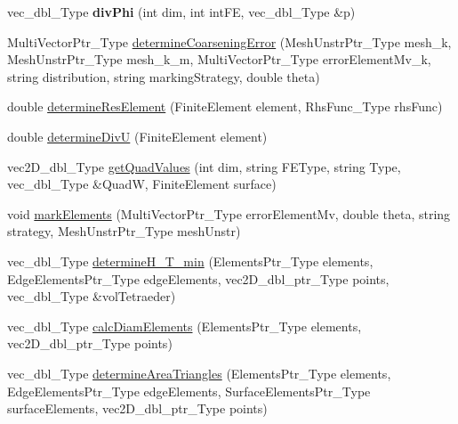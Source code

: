 \begin{DoxyCompactItemize}
\item 
\mbox{\label{classFEDD_1_1ErrorEstimation_a43854de41fd90e4204a87ac5cad78f36}} 
vec\+\_\+dbl\+\_\+\+Type {\bfseries div\+Phi} (int dim, int int\+FE, vec\+\_\+dbl\+\_\+\+Type \&p)
\item 
Multi\+Vector\+Ptr\+\_\+\+Type \hyperlink{classFEDD_1_1ErrorEstimation_afc0daf3841f50012ad8db942b63435ab}{determine\+Coarsening\+Error} (Mesh\+Unstr\+Ptr\+\_\+\+Type mesh\+\_\+k, Mesh\+Unstr\+Ptr\+\_\+\+Type mesh\+\_\+k\+\_\+m, Multi\+Vector\+Ptr\+\_\+\+Type error\+Element\+Mv\+\_\+k, string distribution, string marking\+Strategy, double theta)
\item 
double \hyperlink{classFEDD_1_1ErrorEstimation_a6502dd3ed3942703784a9dc95e656e8f}{determine\+Res\+Element} (Finite\+Element element, Rhs\+Func\+\_\+\+Type rhs\+Func)
\item 
double \hyperlink{classFEDD_1_1ErrorEstimation_a450a2fc3980730dbf0c648e6e9427fd3}{determine\+DivU} (Finite\+Element element)
\item 
vec2\+D\+\_\+dbl\+\_\+\+Type \hyperlink{classFEDD_1_1ErrorEstimation_a642a89cc3290dc92d40ac4d8c2b33266}{get\+Quad\+Values} (int dim, string F\+E\+Type, string Type, vec\+\_\+dbl\+\_\+\+Type \&QuadW, Finite\+Element surface)
\item 
void \hyperlink{classFEDD_1_1ErrorEstimation_a36992830ef4cf5f820ea1c5fedc2a1d1}{mark\+Elements} (Multi\+Vector\+Ptr\+\_\+\+Type error\+Element\+Mv, double theta, string strategy, Mesh\+Unstr\+Ptr\+\_\+\+Type mesh\+Unstr)
\item 
vec\+\_\+dbl\+\_\+\+Type \hyperlink{classFEDD_1_1ErrorEstimation_a256caef9352a4bac19b6d1d2106d14c8}{determine\+H\+\_\+\+T\+\_\+min} (Elements\+Ptr\+\_\+\+Type elements, Edge\+Elements\+Ptr\+\_\+\+Type edge\+Elements, vec2\+D\+\_\+dbl\+\_\+ptr\+\_\+\+Type points, vec\+\_\+dbl\+\_\+\+Type \&vol\+Tetraeder)
\item 
vec\+\_\+dbl\+\_\+\+Type \hyperlink{classFEDD_1_1ErrorEstimation_aafc01a284c3fae0212ba65d224c328f0}{calc\+Diam\+Elements} (Elements\+Ptr\+\_\+\+Type elements, vec2\+D\+\_\+dbl\+\_\+ptr\+\_\+\+Type points)
\item 
vec\+\_\+dbl\+\_\+\+Type \hyperlink{classFEDD_1_1ErrorEstimation_a481426bd550bf88d814ef2e83a5c3dfc}{determine\+Area\+Triangles} (Elements\+Ptr\+\_\+\+Type elements, Edge\+Elements\+Ptr\+\_\+\+Type edge\+Elements, Surface\+Elements\+Ptr\+\_\+\+Type surface\+Elements, vec2\+D\+\_\+dbl\+\_\+ptr\+\_\+\+Type points)
\item 

\end{DoxyCompactItemize}
